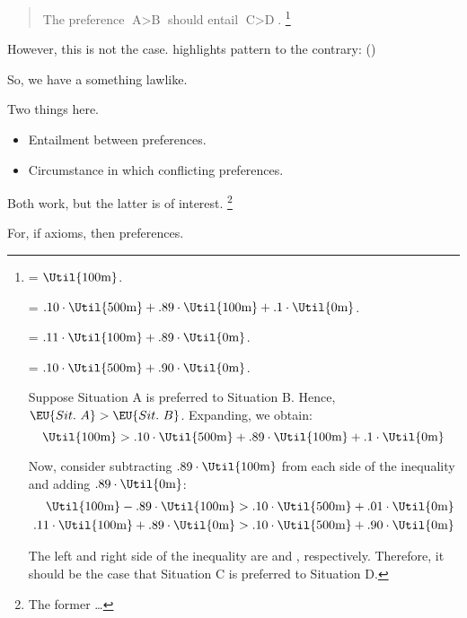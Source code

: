 \begin{note}
  \begin{quote}
    The preference \(\text{A} > \text{B}\) should entail \(\text{C} > \text{D}\).%
    \footnote{
       = \(\Util{100\text{m}}\).

       = \(.10 \cdot \Util{500\text{m}} + .89 \cdot \Util{100\text{m}} + .1 \cdot \Util{0\text{m}}\).

       = \(.11 \cdot \Util{100\text{m}} + .89 \cdot \Util{0\text{m}}\).

       = \(.10 \cdot \Util{500\text{m}} + .90 \cdot \Util{0\text{m}}\).

      Suppose Situation A is preferred to Situation B.
      Hence, \(\EU{Sit.\ A} > \EU{Sit.\ B}\).
      Expanding, we obtain:
      \[
        \Util{100\text{m}} > .10 \cdot \Util{500\text{m}} + .89 \cdot \Util{100\text{m}} + .1 \cdot \Util{0\text{m}}
      \]

      Now, consider subtracting \(.89 \cdot \Util{100\text{m}}\) from each side of the inequality and adding \(.89 \cdot \Util{0\text{m}}\):
      \begin{align*}
        \Util{100\text{m}} - .89 \cdot \Util{100\text{m}} &> .10 \cdot \Util{500\text{m}} + .01 \cdot \Util{0\text{m}} \\
         .11 \cdot \Util{100\text{m}} + .89 \cdot \Util{0\text{m}} &> .10 \cdot \Util{500\text{m}} + .90 \cdot \Util{0\text{m}}
      \end{align*}

      The left and right side of the inequality are  and , respectively.
      Therefore, it should be the case that Situation C is preferred to Situation D.
    }
  \end{quote}
  However, this is not the case.
  \citeauthor{Allais:1979aa} highlights pattern to the contrary:
  (\citeyear[89]{Allais:1979aa})

  So, we have a something lawlike.%

  Two things here.
  \begin{itemize}
  \item
    Entailment between preferences.
  \item
    Circumstance in which conflicting preferences.
  \end{itemize}

  Both work, but the latter is of interest.%
  \footnote{
    \color{red}
    The former \dots
  }

  For, if axioms, then preferences.
\end{note}


